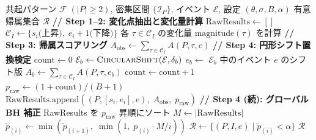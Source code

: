 \begin{algorithm}[!ht]
\caption{帰属スコアリングと統計検定（Step 1--4）}
\label{alg:scoring}
\begin{algorithmic}[1]
\Require 共起パターン $\mathcal{F}\;(|P| \geq 2)$, 密集区間 $\{\mathcal{I}_P\}$, イベント $\mathcal{E}$, 設定 $(\theta, \sigma, B, \alpha)$
\Ensure 有意帰属集合 $\mathcal{R}$
\Statex \textbf{// Step 1--2: 変化点抽出と変化量計算}
\State $\text{RawResults} \gets []$
    \State $\mathcal{C}_I \gets \{s_i \text{(上昇)},\; e_i{+}1 \text{(下降)}\}$
    \State 各 $\tau \in \mathcal{C}_I$ の変化量 $\text{magnitude}(\tau)$ を計算 
    \Statex \textbf{// Step 3: 帰属スコアリング}
        \State $A_{\text{obs}} \gets \sum_{\tau \in \mathcal{C}_I} A(P, \tau, e)$ 
        \Statex \textbf{// Step 4: 円形シフト置換検定}
        \State $\text{count} \gets 0$
            \State $\mathcal{E}_b \gets \Call{CircularShift}{\mathcal{E}, \delta_b}$
            \State $e_b \gets$ $\mathcal{E}_b$ 中のイベント $e$ のシフト版 
            \State $A_b \gets \sum_{\tau \in \mathcal{C}_I} A(P, \tau, e_b)$
             $\text{count} \gets \text{count} + 1$ \EndIf
        \EndFor
        \State $p_{\text{raw}} \gets (1 + \text{count}) / (B + 1)$ 
        \State $\text{RawResults}.\text{append}((P, [s_i,e_i], e),\; A_{\text{obs}},\; p_{\text{raw}})$
    \EndFor
\EndFor
\Statex \textbf{// Step 4 (続): グローバル BH 補正}
\State RawResults を $p_{\text{raw}}$ 昇順にソート
\State $M \gets |\text{RawResults}|$
    \State $\tilde{p}_{(i)} \gets \min(\tilde{p}_{(i+1)},\; \min(1,\; p_{(i)} \cdot M / i))$ 
\EndFor
\State $\mathcal{R} \gets \{(P, I, e) \mid \tilde{p}_{(i)} < \alpha\}$
\State \Return $\mathcal{R}$
\end{algorithmic}
\end{algorithm}
